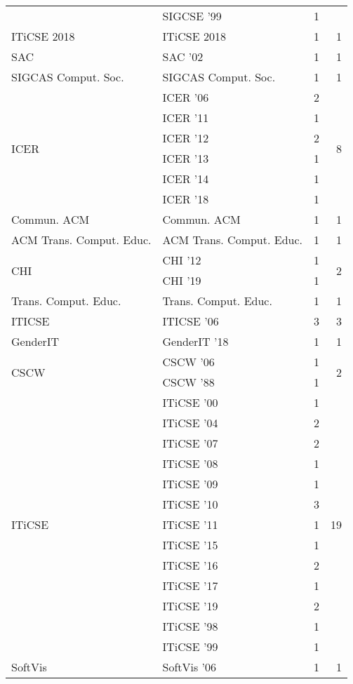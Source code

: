 \begin{table*}[t]
\begin{tabular}{llrr}
& SIGCSE '99 & 1 &\\
\multirow{1}{*}{ITiCSE 2018} & ITiCSE 2018 & 1 & \multirow{1}{*}{1}\\
\multirow{1}{*}{SAC } & SAC '02 & 1 & \multirow{1}{*}{1}\\
\multirow{1}{*}{SIGCAS Comput. Soc.} & SIGCAS Comput. Soc. & 1 & \multirow{1}{*}{1}\\
\multirow{6}{*}{ICER } & ICER '06 & 2 & \multirow{6}{*}{8}\\
& ICER '11 & 1 &\\
& ICER '12 & 2 &\\
& ICER '13 & 1 &\\
& ICER '14 & 1 &\\
& ICER '18 & 1 &\\
\multirow{1}{*}{Commun. ACM} & Commun. ACM & 1 & \multirow{1}{*}{1}\\
\multirow{1}{*}{ACM Trans. Comput. Educ.} & ACM Trans. Comput. Educ. & 1 & \multirow{1}{*}{1}\\
\multirow{2}{*}{CHI } & CHI '12 & 1 & \multirow{2}{*}{2}\\
& CHI '19 & 1 &\\
\multirow{1}{*}{Trans. Comput. Educ.} & Trans. Comput. Educ. & 1 & \multirow{1}{*}{1}\\
\multirow{1}{*}{ITICSE } & ITICSE '06 & 3 & \multirow{1}{*}{3}\\
\multirow{1}{*}{GenderIT } & GenderIT '18 & 1 & \multirow{1}{*}{1}\\
\multirow{2}{*}{CSCW } & CSCW '06 & 1 & \multirow{2}{*}{2}\\
& CSCW '88 & 1 &\\
\multirow{13}{*}{ITiCSE } & ITiCSE '00 & 1 & \multirow{13}{*}{19}\\
& ITiCSE '04 & 2 &\\
& ITiCSE '07 & 2 &\\
& ITiCSE '08 & 1 &\\
& ITiCSE '09 & 1 &\\
& ITiCSE '10 & 3 &\\
& ITiCSE '11 & 1 &\\
& ITiCSE '15 & 1 &\\
& ITiCSE '16 & 2 &\\
& ITiCSE '17 & 1 &\\
& ITiCSE '19 & 2 &\\
& ITiCSE '98 & 1 &\\
& ITiCSE '99 & 1 &\\
\multirow{1}{*}{SoftVis } & SoftVis '06 & 1 & \multirow{1}{*}{1}\\

\end{tabular}
\end{table*}
